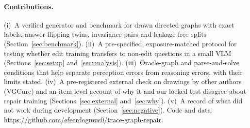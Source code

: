 \paragraph{Contributions.}
(i)~A verified generator and benchmark for drawn directed graphs with exact labels,
answer-flipping twins, invariance pairs and leakage-free splits (Section~\ref{sec:benchmark}).
(ii)~A pre-specified, exposure-matched protocol for testing whether edit training transfers
to non-edit questions in a small VLM (Sections~\ref{sec:setup} and~\ref{sec:analysis}).
(iii)~Oracle-graph and parse-and-solve conditions that help separate perception errors from
reasoning errors, with their limits stated. (iv)~A pre-registered external check on drawings by other authors
(VGCure) and an item-level account of why it and our locked test disagree about repair
training (Sections~\ref{sec:external} and~\ref{sec:why}). (v)~A record of what did not work
during development (Section~\ref{sec:negative}). Code and data: \url{https://github.com/efeerdogmus0/trace-graph-repair}.
